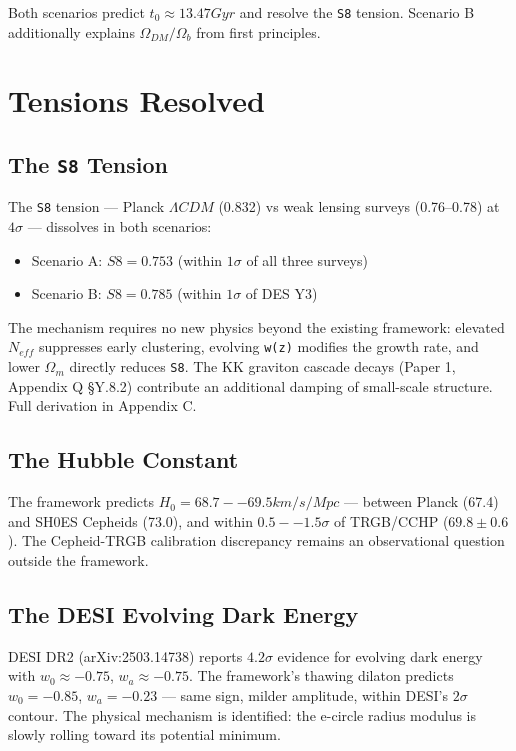 \documentclass[aps,prd,preprint,superscriptaddress,longbibliography]{revtex4-2}
\begin{document}
Both scenarios predict $t_{0} \approx 13.47 Gyr$ and resolve the \texttt{S8} tension. Scenario B additionally explains $\Omega_{DM}/\Omega_b$ from first principles.



\section{Tensions Resolved}


\subsection{The \texttt{S8} Tension}

The \texttt{S8} tension --- Planck $\Lambda CDM$ (0.832) vs weak lensing surveys (0.76--0.78) at $4\sigma$ --- dissolves in both scenarios:


\begin{itemize}
  \item Scenario A: $S8 = 0.753$ (within $1\sigma$ of all three surveys)
  \item Scenario B: $S8 = 0.785$ (within $1\sigma$ of DES Y3)
\end{itemize}

The mechanism requires no new physics beyond the existing framework: elevated $N_{eff}$ suppresses early clustering, evolving \texttt{w(z)} modifies the growth rate, and lower $\Omega_m$ directly reduces \texttt{S8}. The KK graviton cascade decays (Paper 1, Appendix Q \S{}Y.8.2) contribute an additional damping of small-scale structure. Full derivation in Appendix C.


\subsection{The Hubble Constant}

The framework predicts $H_{0} = 68.7--69.5 km/s/Mpc$ --- between Planck (67.4) and SH0ES Cepheids (73.0), and within $0.5--1.5\sigma$ of TRGB/CCHP ($69.8 \pm 0.6$). The Cepheid-TRGB calibration discrepancy remains an observational question outside the framework.


\subsection{The DESI Evolving Dark Energy}

DESI DR2 (arXiv:2503.14738) reports $4.2\sigma$ evidence for evolving dark energy with $w_{0} \approx -0.75$, $w_a \approx -0.75$. The framework's thawing dilaton predicts $w_{0} = -0.85$, $w_a = -0.23$ --- same sign, milder amplitude, within DESI's $2\sigma$ contour. The physical mechanism is identified: the e-circle radius modulus is slowly rolling toward its potential minimum.
\end{document}
